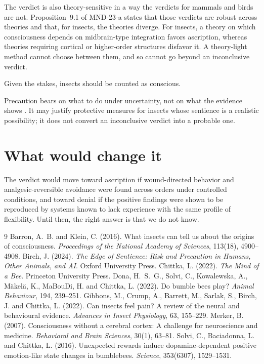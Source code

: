 \documentclass{situationist-preprint}
\begin{document}
The verdict is also theory-sensitive in a way the verdicts for mammals and birds are not. Proposition~9.1 of MND-23-a states that those verdicts are robust across theories and that, for insects, the theories diverge. For insects, a theory on which consciousness depends on midbrain-type integration \citep{Merker2007,Barron2016} favors ascription, whereas theories requiring cortical or higher-order structures disfavor it. A theory-light method cannot choose between them, and so cannot go beyond an inconclusive verdict.

\begin{objection}
Given the stakes, insects should be counted as conscious.
\end{objection}

\begin{reply}
Precaution bears on what to do under uncertainty, not on what the evidence shows \citep{Birch2024}. It may justify protective measures for insects whose sentience is a realistic possibility; it does not convert an inconclusive verdict into a probable one.
\end{reply}

\section{What would change it}

The verdict would move toward ascription if wound-directed behavior and analgesic-reversible avoidance were found across orders under controlled conditions, and toward denial if the positive findings were shown to be reproduced by systems known to lack experience with the same profile of flexibility. Until then, the right answer is that we do not know.

\begin{thebibliography}{9}\small
{} Barron, A.~B. and Klein, C. (2016). What insects can tell us about the origins of consciousness. \emph{Proceedings of the National Academy of Sciences}, 113(18), 4900--4908.
 Birch, J. (2024). \emph{The Edge of Sentience: Risk and Precaution in Humans, Other Animals, and AI}. Oxford University Press.
 Chittka, L. (2022). \emph{The Mind of a Bee}. Princeton University Press.
 Dona, H.~S.~G., Solvi, C., Kowalewska, A., M\"akel\"a, K., MaBouDi, H. and Chittka, L. (2022). Do bumble bees play? \emph{Animal Behaviour}, 194, 239--251.
 Gibbons, M., Crump, A., Barrett, M., Sarlak, S., Birch, J. and Chittka, L. (2022). Can insects feel pain? A review of the neural and behavioural evidence. \emph{Advances in Insect Physiology}, 63, 155--229.
 Merker, B. (2007). Consciousness without a cerebral cortex: A challenge for neuroscience and medicine. \emph{Behavioral and Brain Sciences}, 30(1), 63--81.
 Solvi, C., Baciadonna, L. and Chittka, L. (2016). Unexpected rewards induce dopamine-dependent positive emotion-like state changes in bumblebees. \emph{Science}, 353(6307), 1529--1531.
\end{thebibliography}
\end{document}
